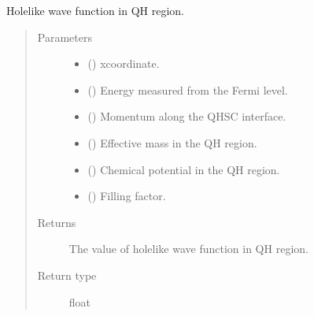 \documentclass[letterpaper,10pt,english]{sphinxmanual}
\begin{document}

\begin{fulllineitems}
\label{\detokenize{modules:modules.functions.chi_m}}
\pysigstartsignatures
{}
\pysigstopsignatures
\sphinxAtStartPar
Hole\sphinxhyphen{}like wave function in QH region.
\begin{quote}\begin{description}
\item[{Parameters}] \leavevmode\begin{itemize}
\item {} 
\sphinxAtStartPar
{} () \textendash{} x\sphinxhyphen{}coordinate.

\item {} 
\sphinxAtStartPar
{} () \textendash{} Energy measured from the Fermi level.

\item {} 
\sphinxAtStartPar
{} () \textendash{} Momentum along the QH\sphinxhyphen{}SC interface.

\item {} 
\sphinxAtStartPar
{} () \textendash{} Effective mass in the QH region.

\item {} 
\sphinxAtStartPar
{} () \textendash{} Chemical potential in the QH region.

\item {} 
\sphinxAtStartPar
{} () \textendash{} Filling factor.

\end{itemize}

\item[{Returns}] \leavevmode
\sphinxAtStartPar
The value of hole\sphinxhyphen{}like wave function in QH region.

\item[{Return type}] \leavevmode
\sphinxAtStartPar
float

\end{description}\end{quote}

\end{fulllineitems}
\end{document}
